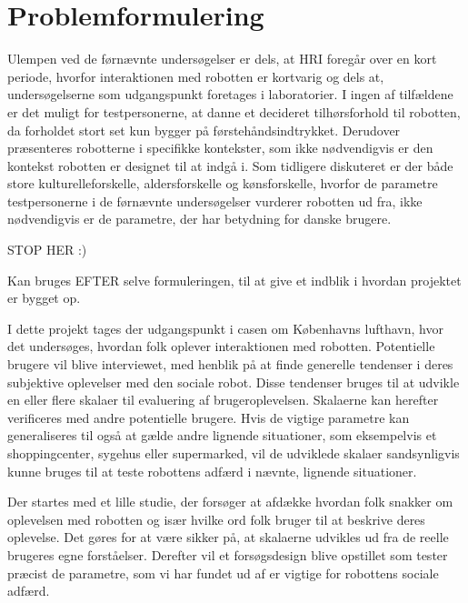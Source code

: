 \section{Problemformulering}
\label{Problemformulering}
%
Ulempen ved de førnævnte undersøgelser er dels, at HRI foregår over en kort periode, hvorfor interaktionen med robotten er kortvarig og dels at, undersøgelserne som udgangspunkt foretages i laboratorier. I ingen af tilfældene er det muligt for testpersonerne, at danne et decideret tilhørsforhold til robotten, da forholdet stort set kun bygger på førstehåndsindtrykket. Derudover præsenteres robotterne i specifikke kontekster, som ikke nødvendigvis er den kontekst robotten er designet til at indgå i. Som tidligere diskuteret er der både store kulturelleforskelle, aldersforskelle og kønsforskelle, hvorfor de parametre testpersonerne i de førnævnte undersøgelser vurderer robotten ud fra, ikke nødvendigvis er de parametre, der har betydning for danske brugere. \blankline



STOP HER :) \blankline


Kan bruges EFTER selve formuleringen, til at give et indblik i hvordan projektet er bygget op. 

I dette projekt tages der udgangspunkt i casen om Københavns lufthavn, hvor det undersøges, hvordan folk oplever interaktionen med robotten. Potentielle brugere vil blive interviewet, med henblik på at finde generelle tendenser i deres subjektive oplevelser med den sociale robot. Disse tendenser bruges til at udvikle en eller flere skalaer til evaluering af brugeroplevelsen. Skalaerne kan herefter verificeres med andre potentielle brugere. Hvis de vigtige parametre kan generaliseres til også at gælde andre lignende situationer, som eksempelvis et shoppingcenter, sygehus eller supermarked, vil de udviklede skalaer sandsynligvis kunne bruges til at teste robottens adfærd i nævnte, lignende situationer.

Der startes med et lille studie, der forsøger at afdække hvordan folk snakker om oplevelsen med robotten og især hvilke ord folk bruger til at beskrive deres oplevelse. Det gøres for at være sikker på, at skalaerne udvikles ud fra de reelle brugeres egne forståelser. Derefter vil et forsøgsdesign blive opstillet som tester præcist de parametre, som vi har fundet ud af er vigtige for robottens sociale adfærd.
